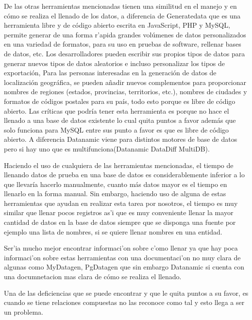 De las otras herramientas mencionadas tienen una similitud en el manejo y en c\'omo se realiza el llenado de los datos, a diferencia de Generatedata que es una herramienta libre y de c\'odigo abierto escrita en JavaScript, PHP y MySQL, permite generar de una forma r'apida grandes vol\'umenes de datos personalizados en una variedad de formatos, para su uso en pruebas de software, rellenar bases de datos, etc. Los desarrolladores pueden escribir sus propios tipos de datos para generar nuevos tipos de datos aleatorios e incluso personalizar los tipos de exportaci\'on, Para las personas interesadas en la generaci\'on de datos de localizaci\'on geogr\'afica, se pueden a\~nadir nuevos complementos para proporcionar nombres de regiones (estados, provincias, territorios, etc.), nombres de ciudades y formatos de c\'odigos postales para su pa\'is, todo esto porque es libre de c\'odigo abierto. Las cr\'iticas que podr\'ia tener esta herramienta es porque no hace el llenado a una base de datos existente lo cual quita puntos a favor adem\'as que solo funciona para MySQL entre sus punto a favor es que es libre de c\'odigo abierto.
A diferencia Datanamic viene para distintos motores de base de datos pero si hay uno que es multifunciona(Datanamic DataDiff MultiDB).

Haciendo el uso de cualquiera de las herramientas mencionadas, el tiempo de llenando datos de prueba en una base de datos es considerablemente inferior a lo que llevar\'ia hacerlo manualmente, cuanto m\'as datos mayor es el tiempo en llenarlo en la forma manual. Sin embargo, haciendo uso de alguna de estas herramientas que ayudan en realizar esta tarea por nosotros, el tiempo es muy similar que llenar pocos registros as'i que es muy conveniente llenar la mayor cantidad de datos en la base de datos siempre que se disponga una fuente por ejemplo una lista de nombres, si se quiere llenar nombres en una entidad. 

Ser'ia mucho mejor encontrar informaci'on sobre c'omo llenar ya que hay poca informaci'on sobre estas herramientas con una documentaci'on no muy clara de algunas como MyDatagen, PgDatagen que sin embargo Datanamic si cuenta con una documnetacion mas clara \cite{datanamictutorial} de c\'omo se realiza el llenado. 

Una de las deficiencias que se puede encontrar y que le quita puntos a su favor, es cuando se tiene relaciones compuestas no las reconoce como tal y esto llega a ser un problema.

